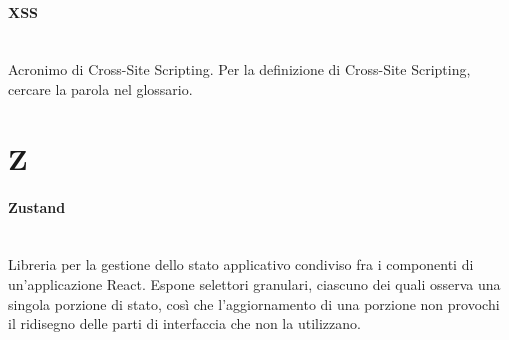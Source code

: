 \documentclass[a4paper, 10pt, colorlinks=true, linkcolor=black, urlcolor=blue, citecolor=blue, hidelinks]{article}
\newcommand{\glossaryterm}[2]{
    \paragraph{#1 \label{term:#1}} \mbox{} \\
    #2
    \vspace{0.5em}
}
\begin{document}
\glossaryterm{XSS}{Acronimo di Cross-Site Scripting. Per la definizione di Cross-Site Scripting, cercare la parola nel glossario.}

\newpage

\section*{Z}

\glossaryterm{Zustand}{Libreria per la gestione dello stato applicativo condiviso fra i componenti di un'applicazione React. Espone selettori granulari, ciascuno dei quali osserva una singola porzione di stato, così che l'aggiornamento di una porzione non provochi il ridisegno delle parti di interfaccia che non la utilizzano.}
\end{document}

